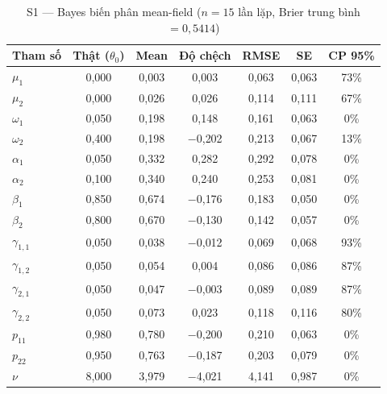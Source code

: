 \documentclass[11pt,a4paper]{article}
\begin{document}
\begin{table}[H]\centering\scriptsize
\caption{S1 --- Bayes biến phân mean-field ($n=15$ lần lặp, Brier trung bình $=0{,}5414$)}
\begin{tabularx}{\textwidth}{l C C C C C C}
\toprule
\textbf{Tham số} & \textbf{Thật ($\theta_0$)} & \textbf{Mean} & \textbf{Độ chệch} & \textbf{RMSE} & \textbf{SE} & \textbf{CP 95\%} \\
\midrule
$\mu_1$ & 0{,}000 & 0{,}003 & 0{,}003 & 0{,}063 & 0{,}063 & 73\% \\
$\mu_2$ & 0{,}000 & 0{,}026 & 0{,}026 & 0{,}114 & 0{,}111 & 67\% \\
$\omega_1$ & 0{,}050 & 0{,}198 & 0{,}148 & 0{,}161 & 0{,}063 & 0\% \\
$\omega_2$ & 0{,}400 & 0{,}198 & $-$0{,}202 & 0{,}213 & 0{,}067 & 13\% \\
$\alpha_1$ & 0{,}050 & 0{,}332 & 0{,}282 & 0{,}292 & 0{,}078 & 0\% \\
$\alpha_2$ & 0{,}100 & 0{,}340 & 0{,}240 & 0{,}253 & 0{,}081 & 0\% \\
$\beta_1$ & 0{,}850 & 0{,}674 & $-$0{,}176 & 0{,}183 & 0{,}050 & 0\% \\
$\beta_2$ & 0{,}800 & 0{,}670 & $-$0{,}130 & 0{,}142 & 0{,}057 & 0\% \\
$\gamma_{1,1}$ & 0{,}050 & 0{,}038 & $-$0{,}012 & 0{,}069 & 0{,}068 & 93\% \\
$\gamma_{1,2}$ & 0{,}050 & 0{,}054 & 0{,}004 & 0{,}086 & 0{,}086 & 87\% \\
$\gamma_{2,1}$ & 0{,}050 & 0{,}047 & $-$0{,}003 & 0{,}089 & 0{,}089 & 87\% \\
$\gamma_{2,2}$ & 0{,}050 & 0{,}073 & 0{,}023 & 0{,}118 & 0{,}116 & 80\% \\
$p_{11}$ & 0{,}980 & 0{,}780 & $-$0{,}200 & 0{,}210 & 0{,}063 & 0\% \\
$p_{22}$ & 0{,}950 & 0{,}763 & $-$0{,}187 & 0{,}203 & 0{,}079 & 0\% \\
$\nu$ & 8{,}000 & 3{,}979 & $-$4{,}021 & 4{,}141 & 0{,}987 & 0\% \\
\bottomrule
\end{tabularx}
\end{table}
\end{document}
